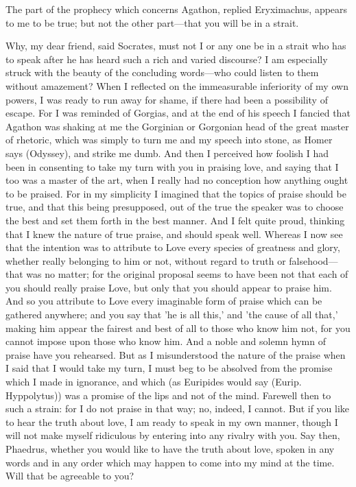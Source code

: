\para[80] The part of the prophecy which concerns Agathon, replied Eryximachus, appears to me to be true; but not the other part---that you will be in a strait.

\para[81] Why, my dear friend, said Socrates, must not I or any one be in a strait who has to speak after he has heard such a rich and varied discourse? I am especially struck with the beauty of the concluding words---who could listen to them without amazement? When I reflected on the immeasurable inferiority of my own powers, I was ready to run away for shame, if there had been a possibility of escape. For I was reminded of Gorgias, and at the end of his speech I fancied that Agathon was shaking at me the Gorginian or Gorgonian head of the great master of rhetoric, which was simply to turn me and my speech into stone, as Homer says (Odyssey), and strike me dumb. And then I perceived how foolish I had been in consenting to take my turn with you in praising love, and saying that I too was a master of the art, when I really had no conception how anything ought to be praised. For in my simplicity I imagined that the topics of praise should be true, and that this being presupposed, out of the true the speaker was to choose the best and set them forth in the best manner. And I felt quite proud, thinking that I knew the nature of true praise, and should speak well. Whereas I now see that the intention was to attribute to Love every species of greatness and glory, whether really belonging to him or not, without regard to truth or falsehood---that was no matter; for the original proposal seems to have been not that each of you should really praise Love, but only that you should appear to praise him. And so you attribute to Love every imaginable form of praise which can be gathered anywhere; and you say that 'he is all this,' and 'the cause of all that,' making him appear the fairest and best of all to those who know him not, for you cannot impose upon those who know him. And a noble and solemn hymn of praise have you rehearsed. But as I misunderstood the nature of the praise when I said that I would take my turn, I must beg to be absolved from the promise which I made in ignorance, and which (as Euripides would say (Eurip. Hyppolytus)) was a promise of the lips and not of the mind. Farewell then to such a strain: for I do not praise in that way; no, indeed, I cannot. But if you like to hear the truth about love, I am ready to speak in my own manner, though I will not make myself ridiculous by entering into any rivalry with you. Say then, Phaedrus, whether you would like to have the truth about love, spoken in any words and in any order which may happen to come into my mind at the time. Will that be agreeable to you?

